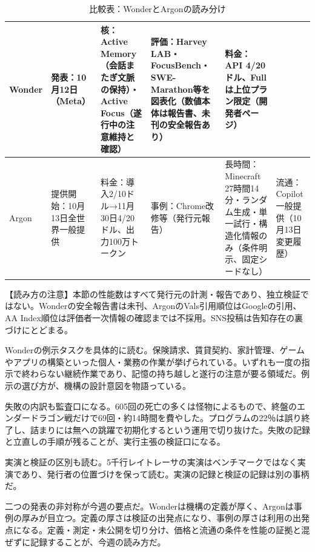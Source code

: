 \documentclass[lualatex,a4paper,10pt]{jlreq}
\begin{document}
\begin{table}[htbp]\centering\footnotesize
\caption{比較表：WonderとArgonの読み分け}
\begin{tabularx}{0.96\linewidth}{@{}lXXXXX@{}}
\toprule
Wonder & 発表：10月12日（Meta） & 核：Active Memory（会話またぎ文脈の保持）・Active Focus（遂行中の注意維持と確認） & 評価：Harvey LAB・FocusBench・SWE-Marathon等を図表化（数値本体は報告書、未刊の安全報告あり） & 料金：API 4/20ドル、Fullは上位プラン限定（開発者ページ） \cite{B01,B62,B63,B02} \\
\midrule
Argon & 提供開始：10月13日全世界一般提供 & 料金：導入2/10ドル→11月30日4/20ドル、出力100万トークン & 事例：Chrome改修等（発行元報告） & 長時間：Minecraft 27時間14分・ランダム生成・単一試行・構造化情報のみ（条件明示、固定シードなし） & 流通：Copilot一般提供（10月13日変更履歴） \cite{B05,B65,B08,B04} \\
\bottomrule
\end{tabularx}
\end{table}

\begin{tcolorbox}[colback=SurveySoft,colframe=SurveyRule,arc=1mm,boxrule=0.4pt,left=2mm,right=2mm]
【読み方の注意】本節の性能数はすべて発行元の計測・報告であり、独立検証ではない。Wonderの安全報告書は未刊、ArgonのVals引用順位はGoogleの引用、AA Index順位は評価者一次情報の確認までは不採用。SNS投稿は告知存在の裏づけにとどまる。
\end{tcolorbox}
\cite{B01,B62,B63,B02,B64,B03,B05,B65,B08,B04,B07,B06}

Wonderの例示タスクを具体的に読む。保険請求、賃貸契約、家計管理、ゲームやアプリの構築といった個人・業務の作業が挙げられている。いずれも一度の指示で終わらない継続作業であり、記憶の持ち越しと遂行の注意が要る領域だ。例示の選び方が、機構の設計意図を物語っている。
\cite{B01,B62,B63,B02,B64,B03}


失敗の内訳も監査口になる。605回の死亡の多くは怪物によるもので、終盤のエンダードラゴン戦だけで69回・約14時間を費やした。プログラムの22％は誤り終了し、詰まりには無への跳躍で初期化するという運用で切り抜けた。失敗の記録と立直しの手順が残ることが、実行主張の検証口になる。
\cite{B05,B65,B08,B04,B07,B06}


実演と検証の区別も読む。5千行レイトレーサの実演はベンチマークではなく実演であり、発行者の位置づけを保って読む。実演の記録と検証の記録は別の事柄だ。
\cite{B05,B65,B08,B04,B07,B06}


二つの発表の非対称が今週の要点だ。Wonderは機構の定義が厚く、Argonは事例の厚みが目立つ。定義の厚さは検証の出発点になり、事例の厚さは利用の出発点になる。定義・測定・未公開を切り分け、価格と流通の条件を性能の証拠と混ぜずに記録することが、今週の読み方だ。
\cite{B01,B62,B63,B02,B64,B03,B05,B65,B08,B04,B07,B06}
\end{document}
